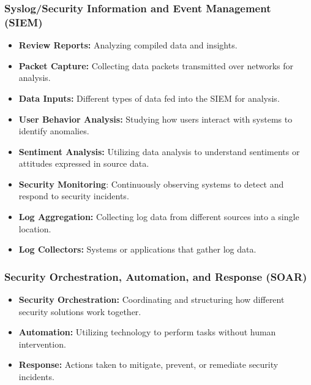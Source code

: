 \begin{fullwidth}
    \subsubsection*{\color{red}Syslog/Security Information and Event Management (SIEM)}
    \begin{itemize}
        \item \textbf{Review Reports:} Analyzing compiled data and insights.
        \item \textbf{Packet Capture:} Collecting data packets transmitted over networks for analysis.
        \item \textbf{Data Inputs:} Different types of data fed into the SIEM for analysis.
        \item \textbf{User Behavior Analysis:} Studying how users interact with systems to identify anomalies.
        \item \textbf{Sentiment Analysis:} Utilizing data analysis to understand sentiments or attitudes expressed in source data.
        \item \textbf{Security Monitoring}: Continuously observing systems to detect and respond to security incidents.
        \item \textbf{Log Aggregation:} Collecting log data from different sources into a single location.
        \item \textbf{Log Collectors:} Systems or applications that gather log data.
    \end{itemize}

    \subsubsection*{\color{red}Security Orchestration, Automation, and Response (SOAR)}
    \begin{itemize}
        \item \textbf{Security Orchestration:} Coordinating and structuring how different security solutions work together.
        \item \textbf{Automation:} Utilizing technology to perform tasks without human intervention.
        \item \textbf{Response:} Actions taken to mitigate, prevent, or remediate security incidents.
    \end{itemize}

\end{fullwidth}
\newpage